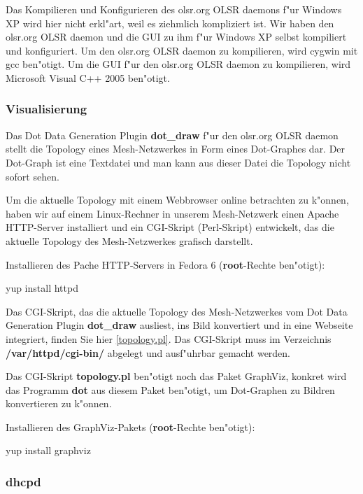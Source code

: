 Das Kompilieren und Konfigurieren des olsr.org OLSR daemons f"ur Windows XP
wird hier nicht erkl"art, weil es ziehmlich kompliziert ist. Wir haben
den olsr.org OLSR daemon und die GUI zu ihm f"ur Windows XP selbst kompiliert
und konfiguriert. Um den olsr.org OLSR daemon zu kompilieren, wird cygwin
mit gcc ben"otigt. Um die GUI f"ur den olsr.org OLSR daemon zu kompilieren,
wird Microsoft Visual C++ 2005 ben"otigt.

\subsubsection{Visualisierung}

Das Dot Data Generation Plugin \textbf{dot\_draw} f"ur den olsr.org OLSR
daemon stellt die Topology eines Mesh-Netzwerkes in Form eines Dot-Graphes dar.
Der Dot-Graph ist eine Textdatei und man kann aus dieser Datei die Topology
nicht sofort sehen.

Um die aktuelle Topology mit einem Webbrowser online betrachten zu k"onnen,
haben wir auf einem Linux-Rechner in unserem Mesh-Netzwerk einen Apache
HTTP-Server installiert und ein CGI-Skript (Perl-Skript) entwickelt,
das die aktuelle Topology des Mesh-Netzwerkes grafisch darstellt.

Installieren des Pache HTTP-Servers in Fedora 6
(\textbf{root}-Rechte ben"otigt):
\begin{shelllst}
yup install httpd
\end{shelllst}

Das CGI-Skript, das die aktuelle Topology des Mesh-Netzwerkes vom
Dot Data Generation Plugin \textbf{dot\_draw} ausliest, ins Bild konvertiert
und in eine Webseite integriert, finden Sie hier \ref{topology.pl}.
Das CGI-Skript muss im Verzeichnis \textbf{/var/httpd/cgi-bin/} abgelegt
und ausf"uhrbar gemacht werden.

Das CGI-Skript \textbf{topology.pl} ben"otigt noch das Paket GraphViz,
konkret wird das Programm \textbf{dot} aus diesem Paket ben"otigt,
um Dot-Graphen zu Bildren konvertieren zu k"onnen.

Installieren des GraphViz-Pakets (\textbf{root}-Rechte ben"otigt):
\begin{shelllst}
yup install graphviz
\end{shelllst}

\subsubsection{dhcpd}

